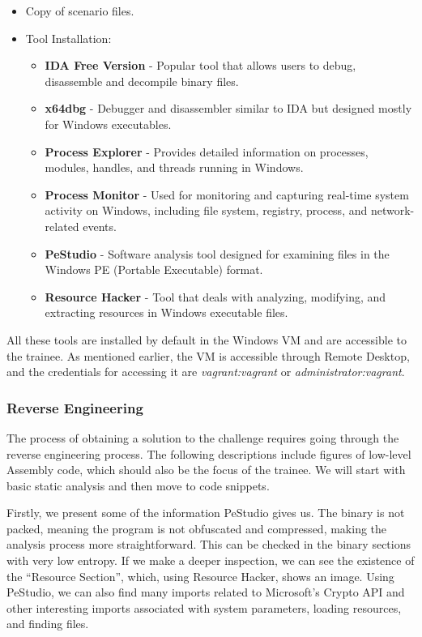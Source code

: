 \begin{itemize}
    \item Copy of scenario files.
    \item Tool Installation:
    \begin{itemize}
        \item \textbf{IDA Free Version} - Popular tool that allows users to debug, disassemble and decompile binary files.
        \item \textbf{x64dbg} - Debugger and disassembler similar to IDA but designed mostly for Windows executables.
        \item \textbf{Process Explorer} - Provides detailed information on processes, modules, handles, and threads running in Windows.
        \item \textbf{Process Monitor} - Used for monitoring and capturing real-time system activity on Windows, including file system, registry, process, and network-related events.
        \item \textbf{PeStudio} - Software analysis tool designed for examining files in the Windows PE (Portable Executable) format.
        \item \textbf{Resource Hacker} - Tool that deals with analyzing, modifying, and extracting resources in Windows executable files.
    \end{itemize}
\end{itemize}

All these tools are installed by default in the Windows VM and are accessible to the trainee. As mentioned earlier, the VM is accessible through Remote Desktop, and the credentials for accessing it are \textit{vagrant:vagrant} or \textit{administrator:vagrant}.

\subsubsection{Reverse Engineering} \label{sec:validation_ransomware_solution}

The process of obtaining a solution to the challenge requires going through the reverse engineering process. The following descriptions include figures of low-level Assembly code, which should also be the focus of the trainee. We will start with basic static analysis and then move to code snippets.

Firstly, we present some of the information PeStudio gives us. The binary is not packed, meaning the program is not obfuscated and compressed, making the analysis process more straightforward. This can be checked in the binary sections with very low entropy. If we make a deeper inspection, we can see the existence of the ``Resource Section'', which, using Resource Hacker, shows an image. Using PeStudio, we can also find many imports related to Microsoft's Crypto API and other interesting imports associated with system parameters, loading resources, and finding files.


